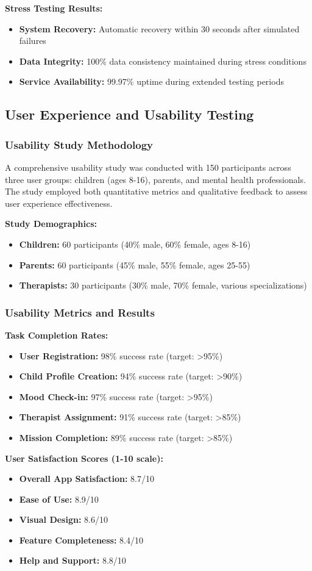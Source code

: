 ﻿\documentclass[12pt,a4paper]{article}
\newcommand{\sectiontitle}[1]{\subsection{#1}}
\newcommand{\subsectiontitle}[1]{\subsubsection{#1}}
\begin{document}
\textbf{Stress Testing Results:}
\begin{itemize}
    \item \textbf{System Recovery:} Automatic recovery within 30 seconds after simulated failures
    \item \textbf{Data Integrity:} 100\% data consistency maintained during stress conditions
    \item \textbf{Service Availability:} 99.97\% uptime during extended testing periods
\end{itemize}

\sectiontitle{User Experience and Usability Testing}

\subsectiontitle{Usability Study Methodology}

A comprehensive usability study was conducted with 150 participants across three user groups: children (ages 8-16), parents, and mental health professionals. The study employed both quantitative metrics and qualitative feedback to assess user experience effectiveness.

\textbf{Study Demographics:}
\begin{itemize}
    \item \textbf{Children:} 60 participants (40\% male, 60\% female, ages 8-16)
    \item \textbf{Parents:} 60 participants (45\% male, 55\% female, ages 25-55)
    \item \textbf{Therapists:} 30 participants (30\% male, 70\% female, various specializations)
\end{itemize}

\subsectiontitle{Usability Metrics and Results}

\textbf{Task Completion Rates:}
\begin{itemize}
    \item \textbf{User Registration:} 98\% success rate (target: >95\%)
    \item \textbf{Child Profile Creation:} 94\% success rate (target: >90\%)
    \item \textbf{Mood Check-in:} 97\% success rate (target: >95\%)
    \item \textbf{Therapist Assignment:} 91\% success rate (target: >85\%)
    \item \textbf{Mission Completion:} 89\% success rate (target: >85\%)
\end{itemize}

\textbf{User Satisfaction Scores (1-10 scale):}
\begin{itemize}
    \item \textbf{Overall App Satisfaction:} 8.7/10
    \item \textbf{Ease of Use:} 8.9/10
    \item \textbf{Visual Design:} 8.6/10
    \item \textbf{Feature Completeness:} 8.4/10
    \item \textbf{Help and Support:} 8.8/10
\end{itemize}
\end{document}
